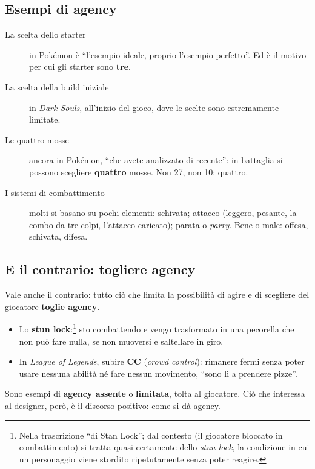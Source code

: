 \subsection{Esempi di agency}

\begin{description}
  \item[La scelta dello starter] in Pokémon è ``l'esempio ideale, proprio
        l'esempio perfetto''. Ed è il motivo per cui gli starter sono
        \textbf{tre}.
  \item[La scelta della build iniziale] in \emph{Dark Souls}, all'inizio del
        gioco, dove le scelte sono estremamente limitate.
  \item[Le quattro mosse] ancora in Pokémon, ``che avete analizzato di
        recente'': in battaglia si possono scegliere \textbf{quattro} mosse.
        Non 27, non 10: quattro.
  \item[I sistemi di combattimento] molti si basano su pochi elementi:
        schivata; attacco (leggero, pesante, la combo da tre colpi, l'attacco
        caricato); parata o \emph{parry}. Bene o male: offesa, schivata,
        difesa.
\end{description}

\subsection{E il contrario: togliere agency}

Vale anche il contrario: tutto ciò che limita la possibilità di agire e di
scegliere del giocatore \textbf{toglie agency}.
\begin{itemize}
  \item Lo \textbf{stun lock}:\footnote{Nella trascrizione ``di Stan
        Lock''; dal contesto (il giocatore bloccato in combattimento) si
        tratta quasi certamente dello \emph{stun lock}, la condizione in cui
        un personaggio viene stordito ripetutamente senza poter reagire.}
        sto combattendo e vengo trasformato in una pecorella che non può fare
        nulla, se non muoversi e saltellare in giro.
  \item In \emph{League of Legends}, subire \textbf{CC} (\emph{crowd
        control}): rimanere fermi senza poter usare nessuna abilità né fare
        nessun movimento, ``sono lì a prendere pizze''.
\end{itemize}
Sono esempi di \textbf{agency assente} o \textbf{limitata}, tolta al
giocatore. Ciò che interessa al designer, però, è il discorso positivo:
come si dà agency.

